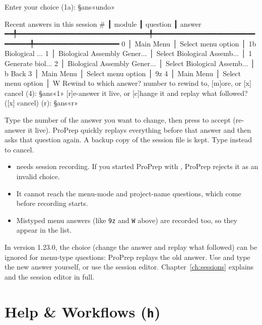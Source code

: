 \begin{screen}
Enter your choice (1a): §ans«undo»

Recent answers in this session
# ┃ module                        ┃ question                     ┃ answer
━━╇━━━━━━━━━━━━━━━━━━━━━━━━━━━━━━━╇━━━━━━━━━━━━━━━━━━━━━━━━━━━━━━╇━━━━━━━━━━━━━━━━━━━━
0 │ Main Menu                     │ Select menu option           │ 1b  Biological ...
1 │ Biological Assembly Gener...  │ Select Biological Assemb...  │ 1  Generate biol...
2 │ Biological Assembly Gener...  │ Select Biological Assemb...  │ b  Back
3 │ Main Menu                     │ Select menu option           │ 9z
4 │ Main Menu                     │ Select menu option           │ W
Rewind to which answer? number to rewind to, [m]ore, or [x] cancel (4): §ans«1»
[r]e-answer it live, or [c]hange it and replay what followed? ([x] cancel) (r): §ans«r»
\end{screen}

Type the number of the answer you want to change, then press  to
accept  (re-answer it live). ProPrep quickly replays everything before
that answer and then asks that question again. A backup copy of the session
file is kept. Type  instead to cancel.

\begin{itemize}
  \item {} needs session recording. If you started ProPrep with
  , ProPrep rejects it as an invalid choice.
  \item It cannot reach the menu-mode and project-name questions, which come
  before recording starts.
  \item Mistyped menu answers (like \texttt{9z} and \texttt{W} above) are recorded too, so
  they appear in the list.
\end{itemize}

\begin{watchout}
In version 1.23.0, the  choice (change the answer and replay what
followed) can be ignored for menu-type questions: ProPrep replays the old
answer. Use  and type the new answer yourself, or use the session editor.
Chapter~\ref{ch:sessions} explains  and the session editor in full.
\end{watchout}

\section{Help \& Workflows (\texttt{h})}\label{sec:menus-help}


